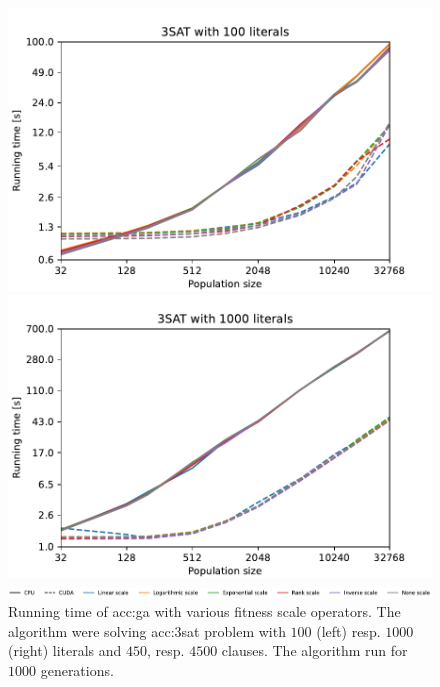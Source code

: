 \begin{figure}[ht!]
    \centering
    \begin{minipage}[t]{0.9\textwidth}
        \begin{minipage}[t]{0.48\textwidth}
            \includegraphics[width=\textwidth]{img/runs/time_ga_scale_100l.pdf}
        \end{minipage}
        \begin{minipage}[t]{0.48\textwidth}
            \includegraphics[width=\textwidth]{img/runs/time_ga_scale_1000l.pdf}
        \end{minipage}
    \end{minipage}

    \begin{minipage}[t]{0.9\textwidth}
        \includegraphics[width=\textwidth]{img/runs/time_ga_scale_legend.pdf}
    \end{minipage}

    \caption[Running time of genetic algorithm with various scale operators]{Running time of \acrlong{acc:ga} with various fitness scale operators. The algorithm were solving \acrshort{acc:3sat} problem with $100$ (left) resp. $1000$ (right) literals and $450$, resp. $4500$ clauses. The algorithm run for $1000$ generations.}
    \label{meas:scale}
\end{figure}



